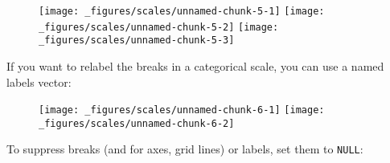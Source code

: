 \begin{figure}[H]
  \texttt{[image: \_figures/scales/unnamed-chunk-5-1]}%
  \texttt{[image: \_figures/scales/unnamed-chunk-5-2]}%
  \texttt{[image: \_figures/scales/unnamed-chunk-5-3]}
\end{figure}

If you want to relabel the breaks in a categorical scale, you can use a
named labels vector:

\begin{Shaded}
\begin{Highlighting}[]
\StringTok{ }\NormalTok{(} \OperatorTok{:}\NormalTok{, } \NormalTok{(}\NormalTok{, }\NormalTok{, }\NormalTok{))}
\OperatorTok{+}\StringTok{ }
\StringTok{  }\NormalTok{()}
\OperatorTok{+}\StringTok{ }
\StringTok{  }\NormalTok{() }\OperatorTok{+}\StringTok{ }
\StringTok{  }\NormalTok{(} \NormalTok{(} \NormalTok{, } \NormalTok{, } \NormalTok{))}
\end{Highlighting}
\end{Shaded}

\begin{figure}[H]
  \texttt{[image: \_figures/scales/unnamed-chunk-6-1]}%
  \texttt{[image: \_figures/scales/unnamed-chunk-6-2]}
\end{figure}

To suppress breaks (and for axes, grid lines) or labels, set them to
\texttt{NULL}:

\begin{Shaded}
\begin{Highlighting}[]
\OperatorTok{+}\StringTok{ }\NormalTok{(} \NormalTok{)}
\OperatorTok{+}\StringTok{ }\NormalTok{(} \NormalTok{)}
\end{Highlighting}
\end{Shaded}

